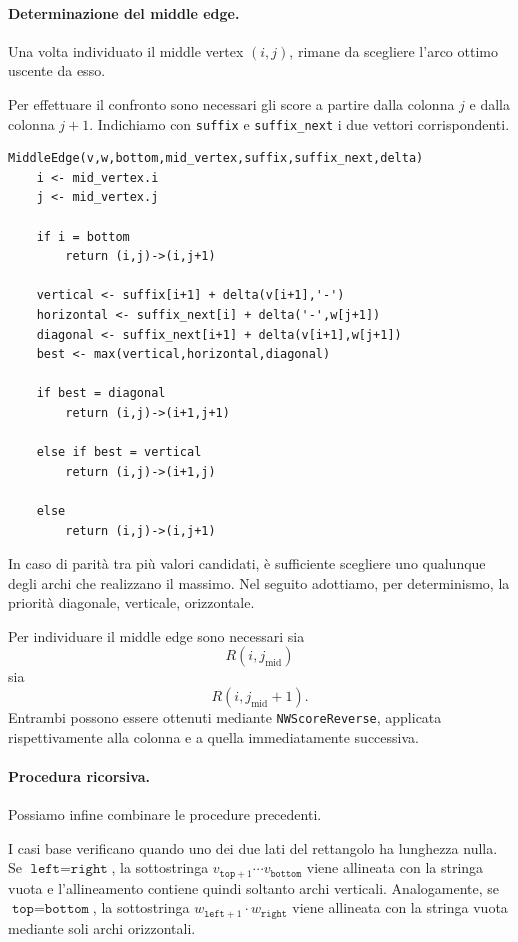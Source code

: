 \paragraph{Determinazione del middle edge.}

Una volta individuato il middle vertex $(i,j)$, rimane da scegliere l'arco ottimo uscente da esso.

Per effettuare il confronto sono necessari gli score a partire dalla colonna $j$ e dalla colonna $j+1$.
Indichiamo con \texttt{suffix} e \texttt{suffix\_next} i due vettori corrispondenti.

\begin{codeblock}
\begin{lstlisting}[style=pseudo,caption={Determinazione del middle edge}]
MiddleEdge(v,w,bottom,mid_vertex,suffix,suffix_next,delta)
    i <- mid_vertex.i
    j <- mid_vertex.j

    if i = bottom
        return (i,j)->(i,j+1)

    vertical <- suffix[i+1] + delta(v[i+1],'-')
    horizontal <- suffix_next[i] + delta('-',w[j+1])
    diagonal <- suffix_next[i+1] + delta(v[i+1],w[j+1])
    best <- max(vertical,horizontal,diagonal)

    if best = diagonal
        return (i,j)->(i+1,j+1)

    else if best = vertical 
        return (i,j)->(i+1,j)

    else
        return (i,j)->(i,j+1)
\end{lstlisting}
\end{codeblock}
In caso di parità tra più valori candidati, è sufficiente scegliere uno qualunque degli
archi che realizzano il massimo. Nel seguito adottiamo, per determinismo, la priorità
diagonale, verticale, orizzontale.

Per individuare il middle edge sono necessari sia
\[
    R(i,j_{\mathrm{mid}})
\]
sia
\[
    R(i,j_{\mathrm{mid}}+1).
\]
Entrambi possono essere ottenuti mediante \texttt{NWScoreReverse}, applicata rispettivamente alla colonna
e a quella immediatamente successiva.

\paragraph{Procedura ricorsiva.}

Possiamo infine combinare le procedure precedenti.

I casi base verificano quando uno dei due lati del rettangolo ha lunghezza nulla.
Se $\texttt{left}=\texttt{right}$, la sottostringa $v_{\texttt{top}+1}\cdots v_{\texttt{bottom}}$
viene allineata con la stringa vuota e l'allineamento contiene quindi soltanto archi verticali.
Analogamente, se $\texttt{top}=\texttt{bottom}$, la sottostringa $w_{\texttt{left}+1}\cdot w_{\texttt{right}}$
viene allineata con la stringa vuota mediante soli archi orizzontali.

